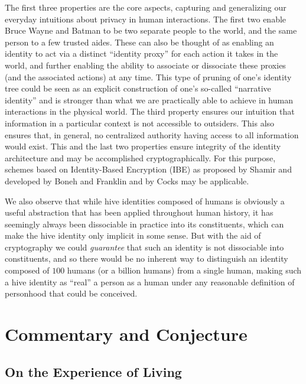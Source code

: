 \documentclass[pra,twocolumn,groupedaddress,10pt]{revtex4}
\theoremstyle{definition}
\begin{document}
The first three properties are the core aspects, capturing and generalizing our everyday intuitions about privacy in human interactions. The first two enable Bruce Wayne and Batman to be two separate people to the world, and the same person to a few trusted aides. These can also be thought of as enabling an identity to act via a distinct ``identity proxy'' for each action it takes in the world, and further enabling the ability to associate or dissociate these proxies (and the associated actions) at any time. This type of pruning of one's identity tree could be seen as an explicit construction of one's so-called ``narrative identity''\cite{narrativeidentity} and is stronger than what we are practically able to achieve in human interactions in the physical world. The third property ensures our intuition that information in a particular context is not accessible to outsiders. This also ensures that, in general, no centralized authority having access to all information would exist. This and the last two properties ensure integrity of the identity architecture and may be accomplished cryptographically. For this purpose, schemes based on Identity-Based Encryption (IBE) as proposed by Shamir\cite{shamir} and developed by Boneh and Franklin\cite{boneh} and by Cocks\cite{cocks} may be applicable.

We also observe that while hive identities composed of humans is obviously a useful abstraction that has been applied throughout human history, it has seemingly always been dissociable in practice into its constituents, which can make the hive identity only implicit in some sense. But with the aid of cryptography we could \textit{guarantee} that such an identity is not dissociable into constituents, and so there would be no inherent way to distinguish an identity composed of $100$ humans (or a billion humans) from a single human, making such a hive identity as ``real'' a person as a human under any reasonable definition of personhood that could be conceived.


\section{Commentary and Conjecture} \label{sec:comcon}

\subsection{On the Experience of Living} \label{sec:expliv}
\end{document}
